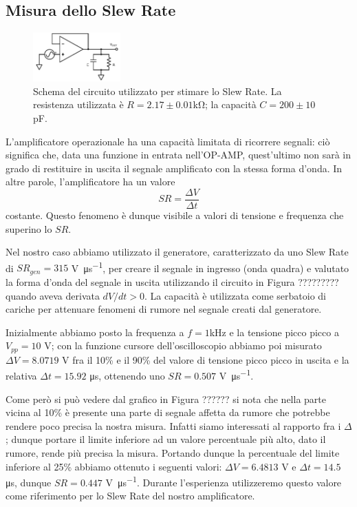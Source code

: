 \subsection{Misura dello Slew Rate}

\begin{figure}
  \begin{center}
    \includegraphics[width=0.30\textwidth]{../E03/latex/slew_rate.pdf}
  \end{center}
  \caption{Schema del circuito utilizzato per stimare lo Slew Rate. La resistenza utilizzata è $R=2.17\pm0.01$\si{\kilo\ohm}; la capacità $C=200 \pm 10$ \si{\pico\farad}.}
  \label{cir2:slew_rate}
\end{figure}

L'amplificatore operazionale ha una capacità limitata di ricorrere segnali: ciò significa che, data una funzione in entrata nell'OP-AMP, quest'ultimo non sarà in grado di restituire in uscita il segnale amplificato con la stessa forma d'onda. In altre parole, l'amplificatore ha un valore
$$SR = \frac{\Delta V}{\Delta t}$$
costante. Questo fenomeno è dunque visibile a valori di tensione e frequenza che superino lo $SR$.

Nel nostro caso abbiamo utilizzato il generatore, caratterizzato da uno Slew Rate di $SR_{gen}=315$ \si{\volt\per\micro\second}, per creare il segnale in ingresso (onda quadra) e valutato la forma d'onda del segnale in uscita utilizzando il circuito in Figura ????????? quando aveva derivata $dV/dt > 0$. La capacità è utilizzata come serbatoio di cariche per attenuare fenomeni di rumore nel segnale creati dal generatore.

Inizialmente abbiamo posto la frequenza a $f=1$\si{\kilo\hertz} e la tensione picco picco a $V_{pp}=10$ \si{\volt}; con la funzione cursore dell'oscilloscopio abbiamo poi misurato $\Delta V = 8.0719$ \si{\volt} fra il 10\% e il 90\% del valore di tensione picco picco in uscita e la relativa $\Delta t = 15.92$ \si{\micro\second}, ottenendo uno $SR=0.507$ \si{\volt\per\micro\second}.

Come però si può vedere dal grafico in Figura ?????? si nota che nella parte vicina al 10\% è presente una parte di segnale affetta da rumore che potrebbe rendere poco precisa la nostra misura. Infatti siamo interessati al rapporto fra i $\Delta$; dunque portare il limite inferiore ad un valore percentuale più alto, dato il rumore, rende più precisa la misura. Portando dunque la percentuale del limite inferiore al 25\% abbiamo ottenuto i seguenti valori: $\Delta V = 6.4813$ \si{\volt} e $\Delta t = 14.5$ \si{\micro\second}, dunque $SR = 0.447$ \si{\volt\per\micro\second}. Durante l'esperienza utilizzeremo questo valore come riferimento per lo Slew Rate del nostro amplificatore.

